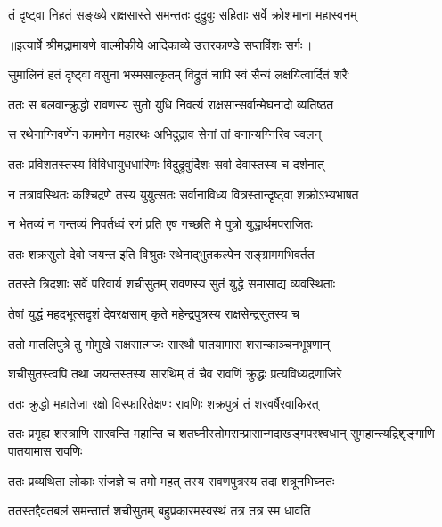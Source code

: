 \twolineshloka
{तं दृष्ट्वा निहतं सङ्ख्ये राक्षसास्ते समन्ततः}
{दुद्रुवुः सहिताः सर्वे क्रोशमाना महास्वनम्} %


{॥इत्यार्षे श्रीमद्रामायणे वाल्मीकीये आदिकाव्ये उत्तरकाण्डे सप्तविंशः सर्गः॥}


\twolineshloka
{सुमालिनं हतं दृष्ट्वा वसुना भस्मसात्कृतम्}
{विद्रुतं चापि स्वं सैन्यं लक्षयित्वार्दितं शरैः} %

\twolineshloka
{ततः स बलवान्क्रुद्धो रावणस्य सुतो युधि}
{निवर्त्य राक्षसान्सर्वान्मेघनादो व्यतिष्ठत} %

\twolineshloka
{स रथेनाग्निवर्णेन कामगेन महारथः}
{अभिदुद्राव सेनां तां वनान्यग्निरिव ज्वलन्} %

\twolineshloka
{ततः प्रविशतस्तस्य विविधायुधधारिणः}
{विदुद्रुवुर्दिशः सर्वा देवास्तस्य च दर्शनात्} %

\twolineshloka
{न तत्रावस्थितः कश्चिद्रणे तस्य युयुत्सतः}
{सर्वानाविध्य वित्रस्तान्दृष्ट्वा शक्रोऽभ्यभाषत} %

\twolineshloka
{न भेतव्यं न गन्तव्यं निवर्तध्वं रणं प्रति}
{एष गच्छति मे पुत्रो युद्धार्थमपराजितः} %

\twolineshloka
{ततः शक्रसुतो देवो जयन्त इति विश्रुतः}
{रथेनाद्भुतकल्पेन सङ्ग्राममभिवर्तत} %

\twolineshloka
{ततस्ते त्रिदशाः सर्वे परिवार्य शचीसुतम्}
{रावणस्य सुतं युद्धे समासाद्य व्यवस्थिताः} %

\twolineshloka
{तेषां युद्धं महदभूत्सदृशं देवरक्षसाम्}
{कृते महेन्द्रपुत्रस्य राक्षसेन्द्रसुतस्य च} %

\twolineshloka
{ततो मातलिपुत्रे तु गोमुखे राक्षसात्मजः}
{सारथौ पातयामास शरान्काञ्चनभूषणान्} %

\twolineshloka
{शचीसुतस्त्वपि तथा जयन्तस्तस्य सारथिम्}
{तं चैव रावणिं क्रुद्धः प्रत्यविध्यद्रणाजिरे} %

\twolineshloka
{ततः क्रुद्धो महातेजा रक्षो विस्फारितेक्षणः}
{रावणिः शक्रपुत्रं तं शरवर्षैरवाकिरत्} %

\threelineshloka
{ततः प्रगृह्य शस्त्राणि सारवन्ति महान्ति च}
{शतघ्नीस्तोमरान्प्रासान्गदाखड्गपरश्वधान्}
{सुमहान्त्यद्रिशृङ्गाणि पातयामास रावणिः} %

\twolineshloka
{ततः प्रव्यथिता लोकाः संजज्ञे च तमो महत्}
{तस्य रावणपुत्रस्य तदा शत्रूनभिघ्नतः} %

\twolineshloka
{ततस्तद्दैवतबलं समन्तात्तं शचीसुतम्}
{बहुप्रकारमस्वस्थं तत्र तत्र स्म धावति} %

